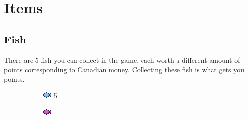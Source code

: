 \documentclass[12pt]{book}
\begin{document}
		\section{Items}
			\subsection{Fish}
				There are 5 fish you can collect in the game, each worth a different amount of points corresponding to Canadian money. Collecting these fish is what gets you points.
				\begin{figure}[h]
					\centering
					\begin{subfigure}[t]{0.16\textwidth}
						\centering
						\includegraphics[width=\textwidth]{BlueFish}
						5
					\end{subfigure}
					\hspace{1mm}
					\begin{subfigure}[t]{0.16\textwidth}
						\centering
						\includegraphics[width=\textwidth]{PurpleFish}

\end{subfigure}
\end{figure}
\end{document}
